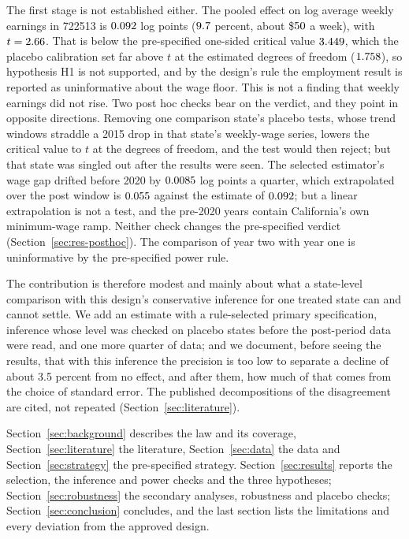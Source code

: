 The first stage is not established either. The pooled effect on log average weekly earnings in
722513 is $0.092$ log points ($9.7$ percent, about \$$50$ a week), with
$t = 2.66$. That is below the pre-specified one-sided critical value $3.449$, which the
placebo calibration set far above $t$ at the estimated degrees of freedom ($1.758$),
so hypothesis H1 is not supported, and by the design's rule the employment result is reported as
uninformative about the wage floor. This is not a finding that weekly earnings did not rise. Two
post hoc checks bear on the verdict, and they point in opposite directions. Removing one
comparison state's placebo tests, whose trend windows straddle a 2015 drop in that state's
weekly-wage series, lowers the critical value to $t$ at the degrees of freedom, and the test
would then reject; but that state was singled out after the results were seen. The selected
estimator's wage gap drifted before 2020 by $0.0085$ log points a quarter, which
extrapolated over the post window is $0.055$ against the estimate of
$0.092$; but a linear extrapolation is not a test, and the pre-2020 years contain
California's own minimum-wage ramp. Neither check changes the pre-specified verdict
(Section~\ref{sec:res-posthoc}). The
comparison of year two with year one is uninformative by the pre-specified power rule.

The contribution is therefore modest and mainly about what a state-level comparison with this
design's conservative inference for one treated state can and cannot settle.
We add an estimate with a rule-selected primary specification, inference whose level was checked
on placebo states before the post-period data were read, and one more quarter of data; and we
document, before seeing the results, that with this inference the precision is too low to
separate a decline of about 3.5 percent from no effect, and after them, how much of that comes
from the choice of standard error. The
published decompositions of the disagreement are cited, not repeated
(Section~\ref{sec:literature}).

Section~\ref{sec:background} describes the law and its coverage, Section~\ref{sec:literature} the
literature, Section~\ref{sec:data} the data and Section~\ref{sec:strategy} the pre-specified
strategy. Section~\ref{sec:results} reports the selection, the inference and power checks and the
three hypotheses; Section~\ref{sec:robustness} the secondary analyses, robustness and placebo
checks; Section~\ref{sec:conclusion} concludes, and the last section lists the limitations and
every deviation from the approved design.

